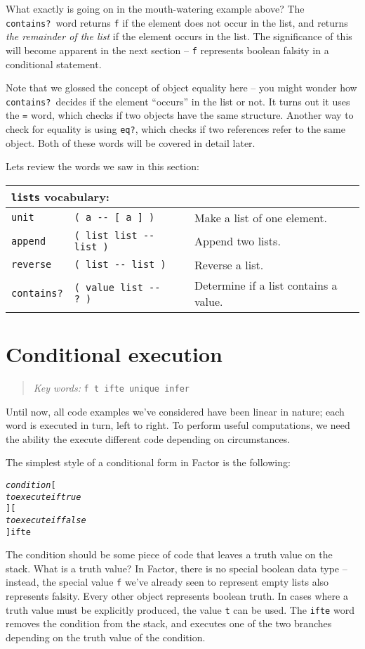 \documentclass[english]{book}
\newcommand{\chapkeywords}[1]{%
\begin{quote}
\emph{Key words:} \texttt{#1}
\end{quote}
}
\newcommand{\wordtable}[1]{{
\begin{tabularx}{12cm}{|l l X|}
#1
\hline
\end{tabularx}}}
\newcommand{\tabvocab}[1]{
\hline
\multicolumn{3}{|l|}{
\rule[-2mm]{0mm}{6mm}
\texttt{#1} vocabulary:}
\\
\hline
}
\begin{document}
What exactly is going on in the mouth-watering example above? The \texttt{contains?}~word returns \texttt{f} if the element does not occur in the list, and returns \emph{the remainder of the list} if the element occurs in the list. The significance of this will become apparent in the next section -- \texttt{f} represents boolean falsity in a conditional statement.

Note that we glossed the concept of object equality here -- you might wonder how \texttt{contains?}~decides if the element ``occurs'' in the list or not. It turns out it uses the \texttt{=} word, which checks if two objects have the same structure. Another way to check for equality is using \texttt{eq?}, which checks if two references refer to the same object. Both of these words will be covered in detail later.

Lets review the words we saw in this section:

\wordtable{
\tabvocab{lists}
\texttt{unit}&
\texttt{( a -{}- {[} a {]} )}&
Make a list of one element.\\
\texttt{append}&
\texttt{( list list -{}- list )}&
Append two lists.\\
\texttt{reverse}&
\texttt{( list -{}- list )}&
Reverse a list.\\
\texttt{contains?}&
\texttt{( value list -{}- ?~)}&
Determine if a list contains a value.\\}

\section{Conditional execution}

\chapkeywords{f t ifte unique infer}

Until now, all code examples we've considered have been linear in nature; each word is executed in turn, left to right. To perform useful computations, we need the ability the execute different code depending on circumstances.

The simplest style of a conditional form in Factor is the following:

\begin{alltt}
\emph{condition} {[}
    \emph{to execute if true}
{] [}
    \emph{to execute if false}
{]} ifte
\end{alltt}

The condition should be some piece of code that leaves a truth value on the stack. What is a truth value? In Factor, there is no special boolean data type
-- instead, the special value \texttt{f} we've already seen to represent empty lists also represents falsity. Every other object represents boolean truth. In cases where a truth value must be explicitly produced, the value \texttt{t} can be used. The \texttt{ifte} word removes the condition from the stack, and executes one of the two branches depending on the truth value of the condition.
\end{document}
